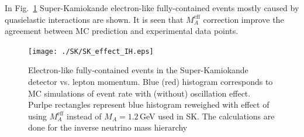 In Fig.~\ref{SKeffect} Super-Kamiokande electron-like fully-contained events mostly caused by quasielastic interactions are shown. It is seen that $M_{A}^{\mathrm{eff}}$ correction improve the agreement between MC prediction and experimental data points.

\begin{figure}[htb!]
\texttt{[image: ./SK/SK\_effect\_IH.eps]}
\caption{\label{SKeffect}Electron-like fully-contained events in the Super-Kamiokande detector vs. lepton momentum. Blue (red) histogram corresponds to MC simulations of event rate with (without) oscillation effect. Purlpe rectangles represent blue histogram reweighed with effect of using $M_{A}^{\mathrm{eff}}$ instead of $M_{A}=1.2$\,GeV used in SK. The calculations are done for the inverse neutrino mass hierarchy}
\end{figure}

